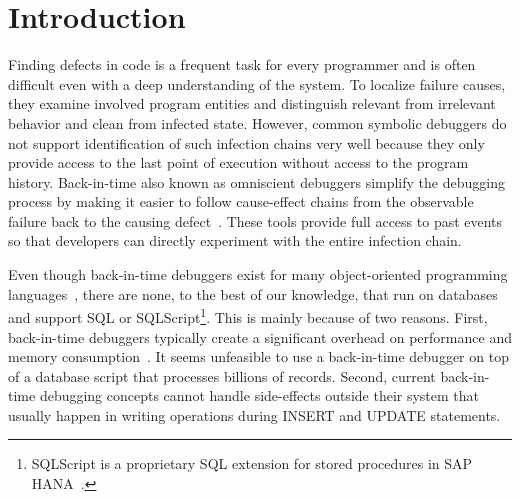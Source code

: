 \documentclass[english,conference,final]{IEEEtran}
\begin{document}


\section{Introduction}

Finding defects in code is a frequent task for every programmer and is often difficult even with a deep understanding of the system.
To localize failure causes, they examine involved program entities and distinguish relevant from irrelevant behavior and clean from infected state. 
However, common symbolic debuggers do not support identification of such infection chains very well because they only provide access to the last point of execution without access to the program history.
Back-in-time also known as omniscient debuggers simplify the debugging process by making it easier to follow cause-effect chains from the observable failure back to the causing defect~\cite{lewis_debugging_2003}.
These tools provide full access to past events so that developers can directly experiment with the entire infection chain. 

Even though back-in-time debuggers exist for many object-oriented programming languages~\cite{feldman_igor:_1988,lewis_debugging_2003}, there are none, to the best of our knowledge, that run on databases and support SQL or SQLScript\footnote{SQLScript is a proprietary SQL extension for stored procedures in SAP HANA~\cite{sqlScript}.}.%
This is mainly because of two reasons. 
First, back-in-time debuggers typically create a significant overhead on performance and memory consumption~\cite{lewis_debugging_2003,pothier_scalable_2007,lienhard_practical_2008}.
It seems unfeasible to use a back-in-time debugger on top of a database script that processes billions of records.
Second, current back-in-time debugging concepts cannot handle side-effects outside their system that usually happen in writing operations during INSERT and UPDATE statements. 
\end{document}
